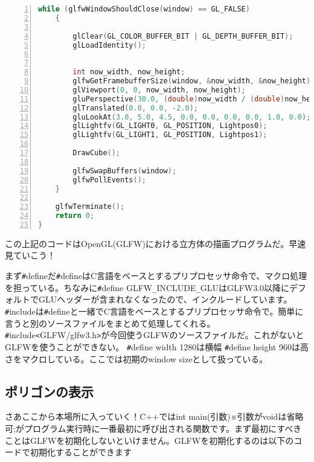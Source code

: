 \documentclass[a4paper,titlepage]{jsarticle}
\begin{document}
\begin{lstlisting}[language=C++,numbers = left]
	while (glfwWindowShouldClose(window) == GL_FALSE)
	{

		glClear(GL_COLOR_BUFFER_BIT | GL_DEPTH_BUFFER_BIT);
		glLoadIdentity();


		int now_width, now_height;
		glfwGetFramebufferSize(window, &now_width, &now_height);
		glViewport(0, 0, now_width, now_height);
		gluPerspective(30.0, (double)now_width / (double)now_height, 1.0, 100.0);
		glTranslated(0.0, 0.0, -2.0);
		gluLookAt(3.0, 5.0, 4.5, 0.0, 0.0, 0.0, 0.0, 1.0, 0.0);
		glLightfv(GL_LIGHT0, GL_POSITION, Lightpos0);
		glLightfv(GL_LIGHT1, GL_POSITION, Lightpos1);

		DrawCube();

		glfwSwapBuffers(window);
		glfwPollEvents();
	}

	glfwTerminate();
	return 0;
}
\end{lstlisting}

この上記のコードはOpenGL(GLFW)における立方体の描画プログラムだ。早速見ていこう！

まず\verb|#|defineだ\verb|#|defineはC言語をベースとするプリプロセッサ命令で、マクロ処理を担っている。ちなみに\verb|#|define GLFW\verb|_|INCLUDE\verb|_|GLUはGLFW3.0以降にデフォルトでGLUヘッダーが含まれなくなったので、インクルードしています。
\verb|#|includeは\verb|#|defineと一緒でC言語をベースとするプリプロセッサ命令で。簡単に言うと別のソースファイルをまとめて処理してくれる。
\verb|#|include\verb|<|GLFW/glfw3.h\verb|>|が今回使うGLFWのソースファイルだ。これがないとGLFWを使うことができない。
\verb|#|define width 1280は横幅 \verb|#|define height 960は高さをマクロしている。ここでは初期のwindow sizeとして扱っている。

\subsection{ポリゴンの表示}

さあここから本場所に入っていく！C++ではint main(引数)※引数がvoidは省略可;がプログラム実行時に一番最初に呼び出される関数です。まず最初にすべきことはGLFWを初期化しないといけません。GLFWを初期化するのは以下のコードで初期化することができます
\end{document}
